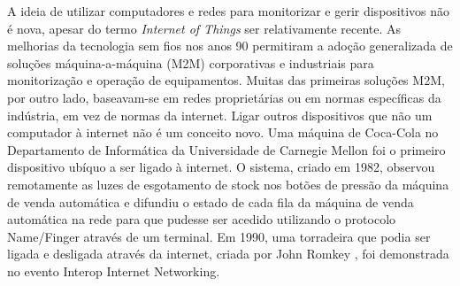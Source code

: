 \documentclass[conference]{IEEEtran}
\begin{document}

A ideia de utilizar computadores e redes para monitorizar e gerir dispositivos
não é nova, apesar do termo \textit{Internet of Things} ser relativamente
recente. As melhorias da tecnologia sem fios nos anos 90 permitiram a adoção
generalizada de soluções máquina-a-máquina (M2M) corporativas e industriais
para monitorização e operação de equipamentos. Muitas das primeiras soluções
M2M, por outro lado, baseavam-se em redes proprietárias ou em normas específicas
da indústria, em vez de normas da internet. Ligar outros dispositivos que
não um computador à internet não é um conceito novo. Uma máquina de Coca-Cola
no Departamento de Informática da Universidade de Carnegie Mellon \cite{EverhartInteresting}
foi o primeiro dispositivo ubíquo a ser ligado à internet. O sistema, criado
em 1982, observou remotamente as luzes de esgotamento de stock nos botões
de pressão da máquina de venda automática e difundiu o estado de cada fila
da máquina de venda automática na rede para que pudesse ser acedido utilizando
o protocolo Name/Finger através de um terminal. Em 1990, uma torradeira que
podia ser ligada e desligada através da internet, criada por John Romkey \cite{RomkeyToast},
foi demonstrada no evento Interop Internet Networking.
\end{document}
